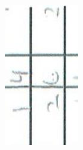 \documentclass[10pt]{article}
\begin{document}
\includegraphics[max width=\textwidth, center]{2025_02_27_dd68c3d38de88f0516d9g-019}\\
\end{document}
